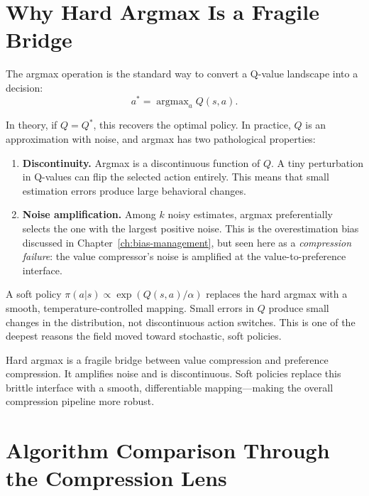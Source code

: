 \section{Why Hard Argmax Is a Fragile Bridge}
\label{sec:fragile-argmax}

The argmax operation is the standard way to convert a Q-value landscape into a
decision:
\begin{equation}
  a^{\ast} = \operatorname{argmax}_a Q(s,a).
\end{equation}

In theory, if $Q = Q^{\ast}$, this recovers the optimal policy.  In practice,
$Q$ is an approximation with noise, and argmax has two pathological properties:

\begin{enumerate}
  \item \textbf{Discontinuity.}  Argmax is a discontinuous function of $Q$.  A
    tiny perturbation in Q-values can flip the selected action entirely.  This
    means that small estimation errors produce large behavioral changes.
  \item \textbf{Noise amplification.}  Among $k$ noisy estimates, argmax
    preferentially selects the one with the largest positive noise.  This is the
    overestimation bias discussed in Chapter~\ref{ch:bias-management}, but seen
    here as a \emph{compression failure}: the value compressor's noise is
    amplified at the value-to-preference interface.
\end{enumerate}

A soft policy $\pi(a|s) \propto \exp(Q(s,a)/\alpha)$ replaces the hard argmax
with a smooth, temperature-controlled mapping.  Small errors in $Q$ produce
small changes in the distribution, not discontinuous action switches.  This is
one of the deepest reasons the field moved toward stochastic, soft policies.

\begin{keyidea}
Hard argmax is a fragile bridge between value compression and preference
compression.  It amplifies noise and is discontinuous.  Soft policies replace
this brittle interface with a smooth, differentiable mapping---making the
overall compression pipeline more robust.
\end{keyidea}


\section{Algorithm Comparison Through the Compression Lens}
\label{sec:compression-table}

